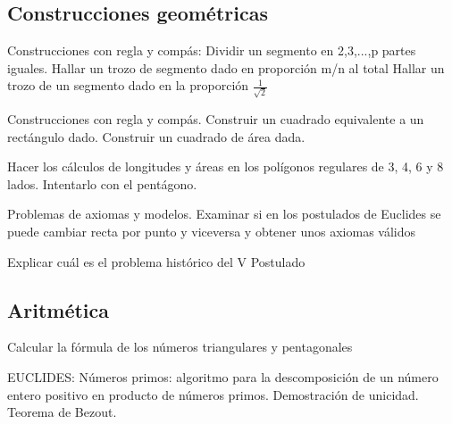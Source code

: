 \subsection{Construcciones geométricas}
\begin{problem}[17]
\ppart Construcciones con regla y compás: Dividir un segmento en 2,3,...,p partes iguales.
\ppart Hallar un trozo de segmento dado en proporción m/n al total
\ppart Hallar un trozo de un segmento dado en la proporción $\frac{1}{\sqrt{2}}$

\solution

\end{problem}

\begin{problem}[18]
Construcciones con regla y compás. Construir un cuadrado equivalente a un rectángulo dado. Construir un cuadrado de área dada.
\solution

\end{problem}

\begin{problem}[19]
Hacer los cálculos de longitudes y áreas en los polígonos regulares de 3, 4, 6 y 8 lados. Intentarlo con el pentágono.
\solution

\end{problem}

\begin{problem}[20]
Problemas de axiomas y modelos. Examinar si en los postulados de Euclides se puede cambiar recta por punto y viceversa y obtener unos axiomas válidos
\solution

\end{problem}


\begin{problem}[21]
Explicar cuál es el problema histórico del V Postulado
\solution

\end{problem}

\subsection{Aritmética}
\begin{problem}[22]
Calcular la fórmula de los números triangulares y pentagonales
\solution

\end{problem}

\begin{problem}[23]
EUCLIDES: Números primos: algoritmo para la descomposición de un número entero positivo en producto de números primos. Demostración de unicidad. Teorema de Bezout.
\solution

\end{problem}

